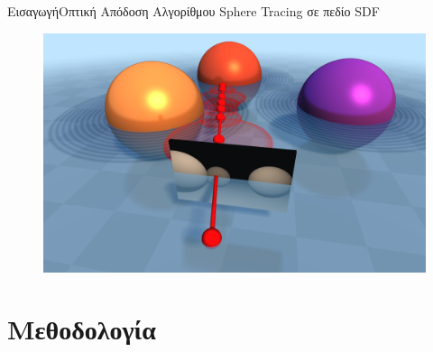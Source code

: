 \documentclass[10pt]{beamer}
\begin{document}
\begin{frame}{Eισαγωγή}{Οπτική Απόδοση Αλγορίθμου Sphere Tracing σε πεδίο SDF}
    \begin{figure}
        \centering
        \includegraphics[width=\textwidth]{images/sphere_tracing3dviz.png}
    \end{figure}
\end{frame}
\section{Μεθοδολογία}
\end{document}
